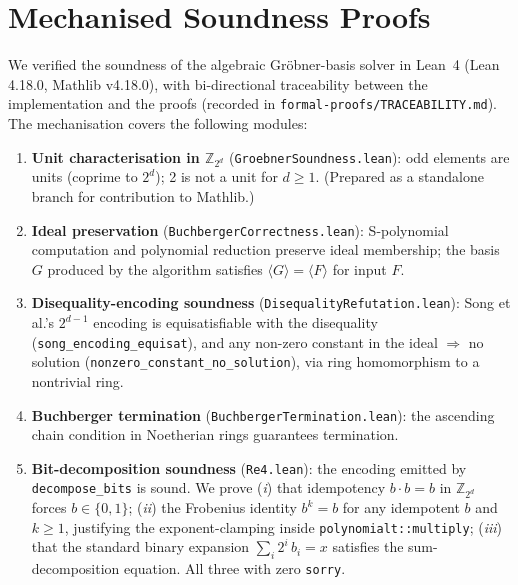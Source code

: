 \documentclass[runningheads]{llncs}
\begin{document}
\section{Mechanised Soundness Proofs}
\label{sec:lean4}

We verified the soundness of the algebraic Gr\"obner-basis solver
in Lean~4 (Lean 4.18.0, Mathlib v4.18.0), with bi-directional
traceability between the implementation and the proofs (recorded
in \texttt{formal-proofs/TRACEABILITY.md}). The mechanisation
covers the following modules:

\begin{enumerate}

\item \textbf{Unit characterisation in $\mathbb{Z}_{2^d}$}
  (\texttt{GroebnerSoundness.lean}): odd elements are units
  (coprime to $2^d$); 2 is not a unit for $d \geq 1$. (Prepared
  as a standalone branch for contribution to Mathlib.)

\item \textbf{Ideal preservation}
  (\texttt{BuchbergerCorrectness.lean}): S-polynomial computation
  and polynomial reduction preserve ideal membership; the basis
  $G$ produced by the algorithm satisfies $\langle G \rangle =
  \langle F \rangle$ for input $F$.

\item \textbf{Disequality-encoding soundness}
  (\texttt{DisequalityRefutation.lean}): Song et al.'s $2^{d-1}$
  encoding is equisatisfiable with the disequality
  (\texttt{song\_encoding\_equisat}), and any non-zero constant in
  the ideal $\Rightarrow$ no solution
  (\texttt{nonzero\_constant\_no\_solution}), via ring homomorphism
  to a nontrivial ring.

\item \textbf{Buchberger termination}
  (\texttt{BuchbergerTermination.lean}): the ascending chain
  condition in Noetherian rings guarantees termination.

\item \textbf{Bit-decomposition soundness} (\texttt{Re4.lean}):
  the encoding emitted by \texttt{decompose\_bits} is sound. We
  prove (\emph{i}) that idempotency $b \cdot b = b$ in
  $\mathbb{Z}_{2^d}$ forces $b \in \{0, 1\}$; (\emph{ii}) the
  Frobenius identity $b^k = b$ for any idempotent $b$ and
  $k \geq 1$, justifying the exponent-clamping inside
  \texttt{polynomialt::multiply}; (\emph{iii}) that the standard
  binary expansion $\sum_i 2^i \,b_i = x$ satisfies the
  sum-decomposition equation. All three with zero
  \texttt{sorry}.


\end{enumerate}
\end{document}
